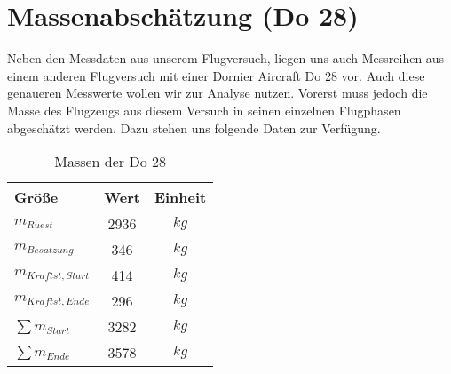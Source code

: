 \chapter{Massenabschätzung (Do 28)}
\label{chapter:masse}
Neben den Messdaten aus unserem Flugversuch, liegen uns auch Messreihen aus einem anderen Flugversuch mit einer Dornier Aircraft Do 28 vor. Auch diese genaueren Messwerte wollen wir zur Analyse nutzen. Vorerst muss jedoch die Masse des Flugzeugs aus diesem Versuch in seinen einzelnen Flugphasen abgeschätzt werden. Dazu stehen uns folgende Daten zur Verfügung. \\

\begin{table}[h]
	\centering
	\begin{tabular}{|l|c|c|}
		\hline
		\textbf{Größe}		 & \textbf{Wert}& \textbf{Einheit} \\ \hline
		$m_{Ruest}$  		 & 2936			& $kg$        \\ \hline
		$m_{Besatzung}$ 	 & 346			& $kg$		  \\ \hline
		$m_{Kraftst,Start}$	 & 414			& $kg$		  \\ \hline
		$m_{Kraftst,Ende}$	 & 296			& $kg$		  \\ \hline
		$\sum m_{Start}$	 & 3282			& $kg$		  \\ \hline
		$\sum m_{Ende}$	 & 3578			& $kg$		   \\ \hline
		
		
		
		
	\end{tabular}
	\caption{Massen der Do 28}
\end{table}


